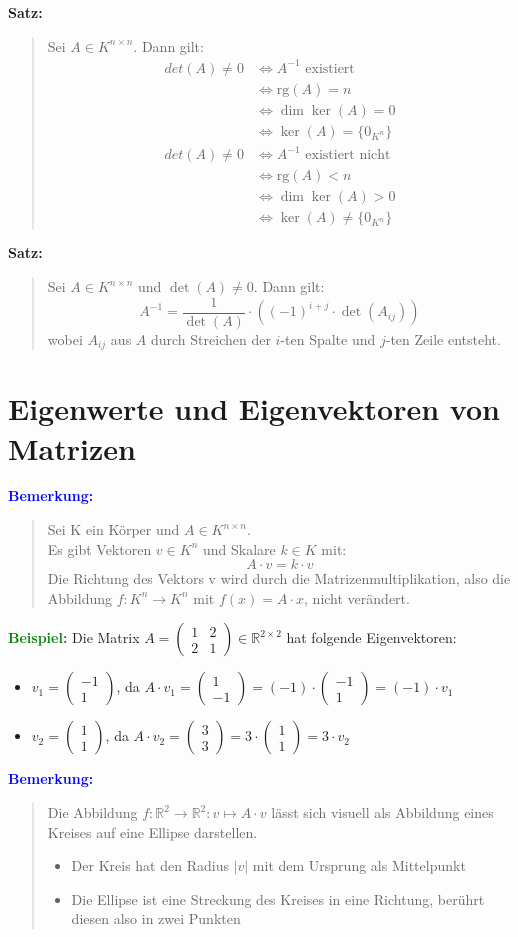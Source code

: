\documentclass{article}
\newcommand{\blue}[1]{\textcolor{blue}{#1}}
\newcommand{\green}[1]{\textcolor{green}{#1}}
\newcommand{\dgr}[1]{\textcolor{dgr}{#1}}
\newcommand{\ex}{\green{\textbf{Beispiel: }}}
\newcommand{\an}[1]{\blue{\textbf{Bemerkung: }}\begin{quote}#1\end{quote}}
\newcommand{\se}[1]{\dgr{\textbf{Satz: }}\begin{quote}#1\end{quote}}
\newcommand{\R}{\mathbb{R}}
\newcommand{\vvec}[2]{\begin{pmatrix}#1\\#2\end{pmatrix}}
\newcommand{\rg}{\text{rg}}
\begin{document}
\se{
    Sei $A \in K^{n \times n}$. Dann gilt:
    \begin{align*}
        det(A) \ne 0 &\iff A^{-1} \text{ existiert}\\
        &\iff \rg(A) = n\\
        &\iff \dim \ker(A) = 0\\
        &\iff \ker(A) = \{0_{K^n}\}
    \end{align*}
    \begin{align*}
        det(A) \ne 0 &\iff A^{-1} \text{ existiert nicht}\\
        &\iff \rg(A) < n\\
        &\iff \dim \ker(A) > 0\\
        &\iff \ker(A) \ne \{0_{K^n}\}
    \end{align*}
}

\se{
    Sei $A \in K^{n  \times n}$ und $\det(A) \ne 0$. Dann gilt:
    \[
        A^{-1} = \frac{1}{\det(A)} \cdot ((-1)^{i+j} \cdot \det(A_{ij}))   
    \]
    wobei $A_{ij}$ aus $A$ durch Streichen der $i$-ten Spalte und $j$-ten Zeile entsteht.
}

\newpage
\section{Eigenwerte und Eigenvektoren von Matrizen}

\an{
    Sei K ein Körper und $A \in K^{n \times n}$.\\
    Es gibt Vektoren $v \in K^n$ und Skalare $k \in K$ mit:
    \[
        A \cdot v = k \cdot v
    \]
    Die Richtung des Vektors v wird durch die Matrizenmultiplikation, also die Abbildung $f: K^n \to K^n$ mit $f(x) = A \cdot x$, nicht verändert.
}

\ex Die Matrix $A = \begin{pmatrix}
    1 & 2\\
    2 & 1
\end{pmatrix} \in \R^{2 \times 2}$ hat folgende Eigenvektoren:
\begin{itemize}
    \item $v_1 = \vvec{-1}{1}$, da $A \cdot v_1 = \vvec{1}{-1} = (-1) \cdot \vvec{-1}{1} = (-1) \cdot v_1$
    \item $v_2 = \vvec{1}{1}$, da $A \cdot v_2 = \vvec{3}{3} = 3 \cdot \vvec{1}{1} = 3 \cdot v_2$
\end{itemize}

\an{
    Die Abbildung $f: \R^2 \to \R^2: v \mapsto A \cdot v$ lässt sich visuell als Abbildung eines Kreises auf eine Ellipse darstellen.
    \begin{itemize}
        \item Der Kreis hat den Radius $|v|$ mit dem Ursprung als Mittelpunkt
        \item Die Ellipse ist eine Streckung des Kreises in eine Richtung, berührt diesen also in zwei Punkten
    \end{itemize}
}
\end{document}
